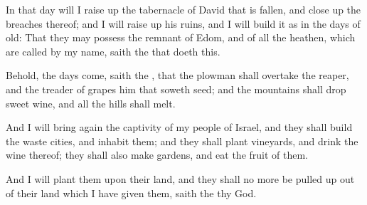 \verse In that day will I raise up the tabernacle of David that is fallen, and close up the breaches thereof; and I will raise up his ruins, and I will build it as in the days of old: \verse That they may possess the remnant of Edom, and of all the heathen, which are called by my name, saith the \LORD that doeth this.

\verse Behold, the days come, saith the \LORD, that the plowman shall overtake the reaper, and the treader of grapes him that soweth seed; and the mountains shall drop sweet wine, and all the hills shall melt.

\verse And I will bring again the captivity of my people of Israel, and they shall build the waste cities, and inhabit them; and they shall plant vineyards, and drink the wine thereof; they shall also make gardens, and eat the fruit of them.

\verse And I will plant them upon their land, and they shall no more be pulled up out of their land which I have given them, saith the \LORD thy God.

